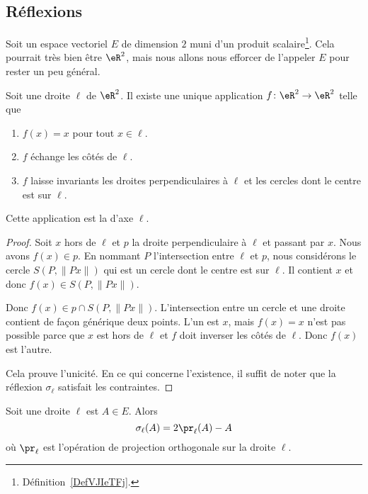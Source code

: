 \subsection{Réflexions}

Soit un espace vectoriel \( E\) de dimension \( 2\) muni d'un produit scalaire\footnote{Définition~\ref{DefVJIeTFj}.}. Cela pourrait très bien être \( \eR^2\), mais nous allons nous efforcer de l'appeler \( E\) pour rester un peu général.

\begin{lemmaDef}        \label{DEFooLJKDooUaamen}
	Soit une droite \( \ell\) de \( \eR^2\). Il existe une unique application \( f\colon \eR^2\to \eR^2\) telle que
	\begin{enumerate}
		\item
		      \( f(x)=x\) pour tout \( x\in \ell\).
		\item
		      \( f\) échange les côtés de \( \ell\).
		\item
		      \( f\) laisse invariants les droites perpendiculaires à \( \ell\) et les cercles dont le centre est sur \( \ell\).
	\end{enumerate}
	Cette application est la  d'axe \( \ell\).
\end{lemmaDef}

\begin{proof}
	Soit \( x\) hors de \( \ell\) et \( p\) la droite perpendiculaire à \( \ell\) et passant par \( x\). Nous avons \( f(x)\in p\). En nommant \( P\) l'intersection entre \( \ell\) et \( p\), nous considérons le cercle \( S(P,\| Px \|)\) qui est un cercle dont le centre est sur \( \ell\). Il contient \( x\) et donc \( f(x)\in S(P,\| Px \|)\).

	Donc \( f(x)\in p\cap S(P,\| Px \|)\). L'intersection entre un cercle et une droite contient de façon générique deux points. L'un est \( x\), mais \( f(x)=x\) n'est pas possible parce que \( x\) est hors de \( \ell\) et \( f\) doit inverser les côtés de \( \ell\). Donc \( f(x)\) est l'autre.

	Cela prouve l'unicité. En ce qui concerne l'existence, il suffit de noter que la réflexion \( \sigma_{\ell}\) satisfait les contraintes.
\end{proof}

\begin{lemma}       \label{LEMooZSDRooUkNYer}
	Soit une droite \( \ell\) est \( A\in E\). Alors
	\begin{equation}        \label{EQooVUQDooKuwszl}
		\sigma_{\ell}(A)=2\pr_{\ell}(A)-A
	\end{equation}
	où \( \pr_{\ell}\) est l'opération de projection orthogonale sur la droite \( \ell\).
\end{lemma}

